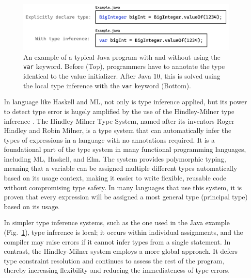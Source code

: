 \begin{figure}[hbt]
\centering  \includegraphics[width=\linewidth]{ExampleJava}
  \caption[An example of a typical Java program with and without using the \texttt{var} keyword]{
    \label{fig:example-java}
      An example of a typical Java program with and without using the \texttt{var} keyword. Before (Top), programmers have to annotate the type identical to the value initializer. After Java 10, this is solved using the local type inference with the \texttt{var} keyword (Bottom).
    }
\end{figure}

In language like Haskell and ML, not only is type inference applied, but its power to detect type error is hugely amplified by the use of the Hindley-Milner type inference  \cite{Damas1982-zw}. The Hindley-Milner Type System, named after its inventors Roger Hindley and Robin Milner, is a type system that can automatically infer the types of expressions in a language with no annotations required. It is a foundational part of the type system in many functional programming languages, including ML, Haskell, and Elm. The system provides polymorphic typing, meaning that a variable can be assigned multiple different types automatically based on its usage context, making it easier to write flexible, reusable code without compromising type safety. In many languages that use this system, it is proven that every expression will be assigned a most general type (principal type) based on its usage. 


In simpler type inference systems, such as the one used in the Java example (Fig.~\ref{fig:example-java}), type inference is local; it occurs within individual assignments, and the compiler may raise errors if it cannot infer types from a single statement. In contrast, the Hindley-Milner system employs a more global approach. It defers type constraint resolution and continues to assess the rest of the program, thereby increasing flexibility and reducing the immediateness of type errors.




